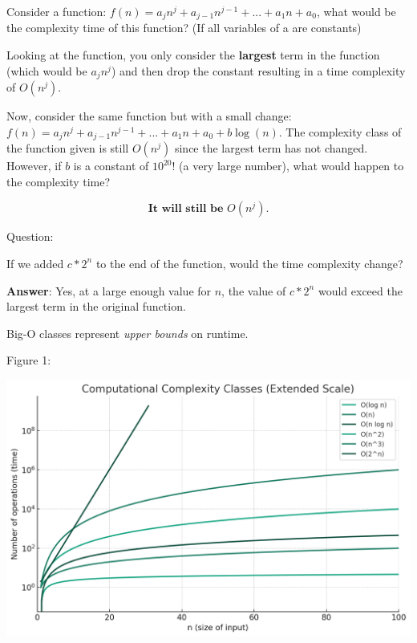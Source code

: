 \documentclass[11pt,a4paper,english]{paper}
\begin{document}
Consider a function: $f(n) = a_{j}n^{j} + a_{j-1}n^{j-1} + ... + a_{1}n + a_0$, what would be the complexity time of this function? (If all variables of a are constants)



\bigskip

\noindent Looking at the function, you only consider the \textbf{largest} term in the function (which would be $a_{j}n^j$) and then drop the constant resulting in a time complexity of $O(n^{j})$.

\bigskip

\noindent Now, consider the same function but with a small change: $f(n) = a_{j}n^{j} + a_{j-1}n^{j-1} + ... + a_{1}n + a_0 + b\log(n)$. The complexity class of the function given is still $O(n^{j})$ since the largest term has not changed. However, if $b$ is a constant of $10^{20}!$ (a very large number), what would happen to the complexity time?

\[ \textbf{It will still be $O(n^{j})$.}\]

\bigskip

\begin{gbox}{Question:} {

    If we added $c * 2^{n}$ to the end of the function, would the time complexity change?

    \bigskip

    \textbf{Answer}: Yes, at a large enough value for $n$, the value of $c * 2^{n}$ would exceed the largest term in the original function.


}\end{gbox}

\bigskip

\noindent Big-O classes represent \textit{upper bounds} on runtime.

\bigskip

\begin{bbox}{Figure 1:} {


        \includegraphics[width=\textwidth]{o_vs_n.png}
}\end{bbox}
\end{document}
